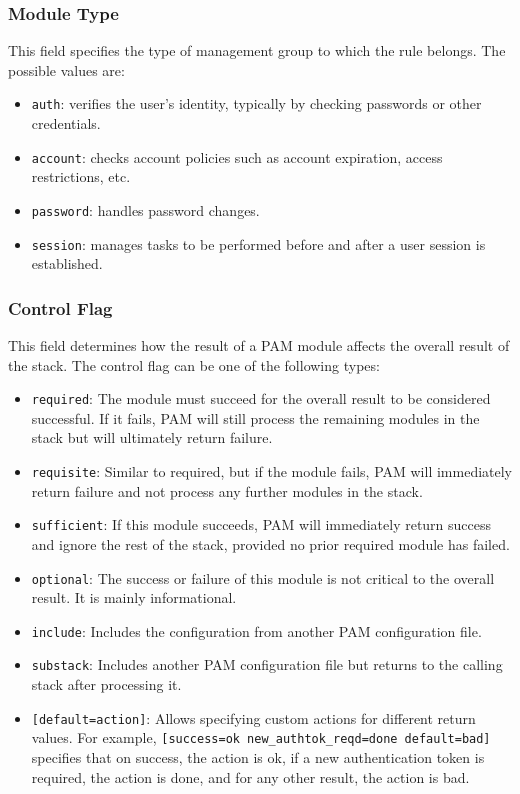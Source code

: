 \documentclass{article}
\begin{document}
\subsubsection{Module Type}
This field specifies the type of management group to which the rule belongs. The possible values are:
\begin{itemize}
    \item \verb|auth|: verifies the user's identity, typically by checking passwords or other credentials.
    \item \verb|account|: checks account policies such as account expiration, access restrictions, etc.
    \item \verb|password|: handles password changes.
    \item \verb|session|: manages tasks to be performed before and after a user session is established.
\end{itemize}

\subsubsection{Control Flag}
This field determines how the result of a PAM module affects the overall result of the stack. The control flag can be one of the following types:
\begin{itemize}
    \item \verb|required|: The module must succeed for the overall result to be considered successful. If it fails, PAM will still process the remaining modules in the stack but will ultimately return failure.
    \item \verb|requisite|: Similar to required, but if the module fails, PAM will immediately return failure and not process any further modules in the stack.
    \item \verb|sufficient|: If this module succeeds, PAM will immediately return success and ignore the rest of the stack, provided no prior required module has failed.
    \item \verb|optional|: The success or failure of this module is not critical to the overall result. It is mainly informational.
    \item \verb|include|: Includes the configuration from another PAM configuration file.
    \item \verb|substack|: Includes another PAM configuration file but returns to the calling stack after processing it.
    \item \verb|[default=action]|: Allows specifying custom actions for different return values. For example, \verb|[success=ok new_authtok_reqd=done default=bad]| specifies that on success, the action is ok, if a new authentication token is required, the action is done, and for any other result, the action is bad.    
\end{itemize}
\end{document}
